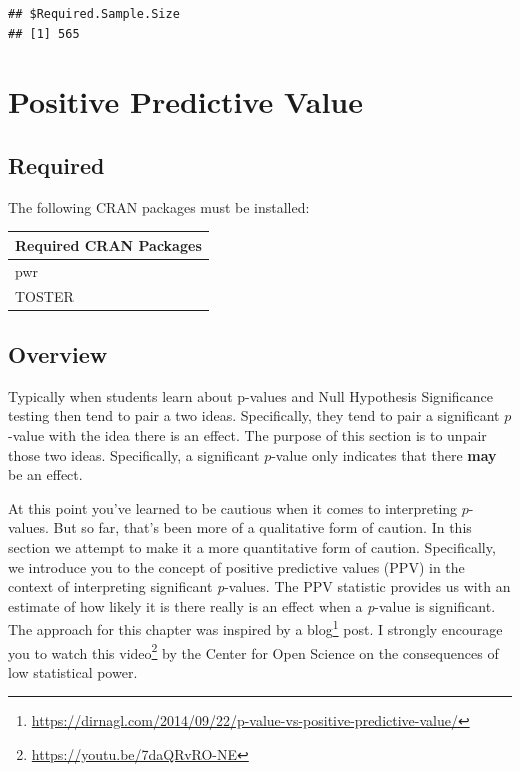 \documentclass[
]{krantz}
\renewcommand{\href}[2]{#2\footnote{\url{#1}}}
\begin{document}
\begin{verbatim}
## $Required.Sample.Size
## [1] 565
\end{verbatim}

\hypertarget{positive-predictive-value}{%
\chapter{Positive Predictive Value}\label{positive-predictive-value}}

\hypertarget{required-6}{%
\section{Required}\label{required-6}}

The following CRAN packages must be installed:

\begin{longtable}[]{@{}l@{}}
\toprule
Required CRAN Packages \\
\midrule
\endhead
pwr \\
TOSTER \\
\bottomrule
\end{longtable}

\hypertarget{overview-5}{%
\section{Overview}\label{overview-5}}

Typically when students learn about p-values and Null Hypothesis Significance testing then tend to pair a two ideas. Specifically, they tend to pair a significant \(p\)-value with the idea there is an effect. The purpose of this section is to unpair those two ideas. Specifically, a significant \(p\)-value only indicates that there \textbf{may} be an effect.

At this point you've learned to be cautious when it comes to interpreting \(p\)-values. But so far, that's been more of a qualitative form of caution. In this section we attempt to make it a more quantitative form of caution. Specifically, we introduce you to the concept of positive predictive values (PPV) in the context of interpreting significant \emph{p}-values. The PPV statistic provides us with an estimate of how likely it is there really is an effect when a \emph{p}-value is significant. The approach for this chapter was inspired by a \href{https://dirnagl.com/2014/09/22/p-value-vs-positive-predictive-value/}{blog} post. I strongly encourage you to watch \href{https://youtu.be/7daQRvRO-NE}{this video} by the Center for Open Science on the consequences of low statistical power.
\end{document}
